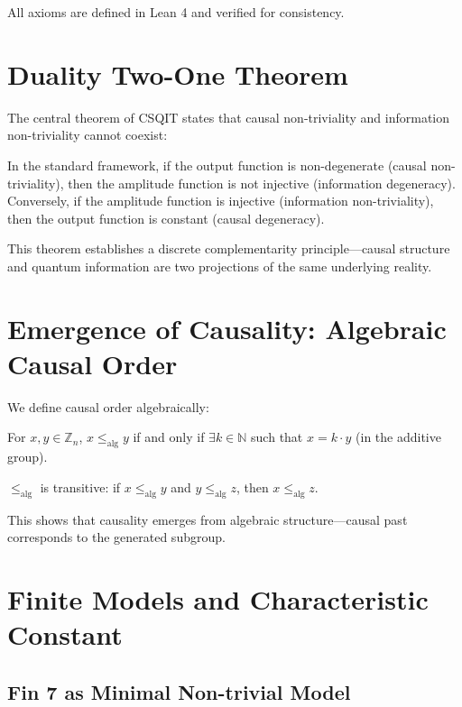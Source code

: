 \documentclass[aps,prd,twocolumn,nofootinbib,floatfix]{revtex4-2}
\begin{document}
All axioms are defined in Lean 4 and verified for consistency.

\section{Duality Two-One Theorem}

The central theorem of CSQIT states that causal non-triviality and information non-triviality cannot coexist:

\begin{theorem}
In the standard framework, if the output function is non-degenerate (causal non-triviality), then the amplitude function is not injective (information degeneracy). Conversely, if the amplitude function is injective (information non-triviality), then the output function is constant (causal degeneracy).
\end{theorem}

This theorem establishes a discrete complementarity principle---causal structure and quantum information are two projections of the same underlying reality.

\section{Emergence of Causality: Algebraic Causal Order}

We define causal order algebraically:

\begin{definition}
For $x, y \in \mathbb{Z}_n$, $x \le_{\text{alg}} y$ if and only if $\exists k \in \mathbb{N}$ such that $x = k \cdot y$ (in the additive group).
\end{definition}

\begin{theorem}[Transitivity]
$\le_{\text{alg}}$ is transitive: if $x \le_{\text{alg}} y$ and $y \le_{\text{alg}} z$, then $x \le_{\text{alg}} z$.
\end{theorem}

This shows that causality emerges from algebraic structure---causal past corresponds to the generated subgroup.

\section{Finite Models and Characteristic Constant}

\subsection{Fin 7 as Minimal Non-trivial Model}
\end{document}
